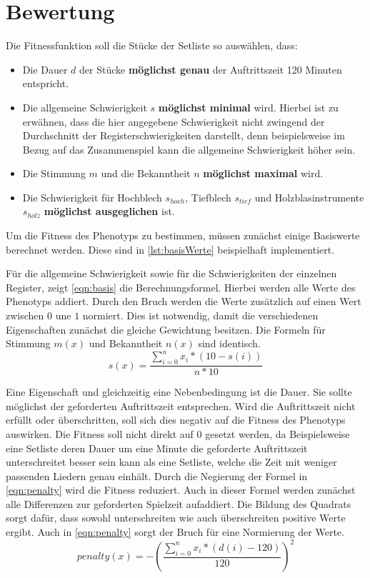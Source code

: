 \section{Bewertung}\label{sec:fitness}
Die Fitnessfunktion soll die Stücke der Setliste so auswählen, dass:
\begin{itemize}
    \item Die Dauer $d$ der Stücke \textbf{möglichst genau} der Auftrittszeit 120 Minuten entspricht.
    \item Die allgemeine Schwierigkeit $s$ \textbf{möglichst minimal} wird. Hierbei ist zu erwähnen, dass die hier
        angegebene Schwierigkeit nicht zwingend der Durchschnitt der Registerschwierigkeiten darstellt, denn
        beispielsweise im Bezug auf das Zusammenspiel kann die allgemeine Schwierigkeit höher sein.
    \item Die Stimmung $m$ und die Bekanntheit $n$ \textbf{möglichst maximal} wird.
    \item Die Schwierigkeit für Hochblech $s_{hoch}$, Tiefblech $s_{tief}$ und Holzblasinstrumente $s_{holz}$ \textbf{möglichst ausgeglichen} ist.
\end{itemize}
Um die Fitness des Phenotyps zu bestimmen, müssen zunächst einige Basiswerte berechnet werden. Diese sind in \autoref{lst:basisWerte} beispielhaft implementiert.

Für die allgemeine Schwierigkeit sowie für die Schwierigkeiten der einzelnen Register, zeigt \autoref{eqn:basis} die Berechnungsformel. Hierbei werden alle Werte des
Phenotyps addiert. Durch den Bruch werden die Werte zusätzlich auf einen Wert zwischen $0$ une $1$ normiert. Dies ist notwendig, 
damit die verschiedenen Eigenschaften zunächst die gleiche Gewichtung besitzen. 
Die Formeln für Stimmung $m(x)$ und Bekanntheit $n(x)$ sind identisch.
\begin{equation}
    s(x) = \frac{\sum_{i=0}^{n} x_i * (10 - s(i)) }{n * 10}
    \label{eqn:basis}
\end{equation}

Eine Eigenschaft und gleichzeitig eine Nebenbedingung ist die Dauer. Sie sollte möglichst der geforderten Auftrittszeit entsprechen. Wird die Auftrittszeit nicht erfüllt
oder überschritten, soll sich dies negativ auf die Fitness des Phenotyps auswirken. Die Fitness soll nicht direkt auf 0 gesetzt werden, da
Beispielsweise eine Setliste deren Dauer um eine Minute die geforderte Auftrittszeit unterschreitet besser sein kann als eine Setliste, welche die Zeit mit weniger passenden Liedern 
genau einhält.
Durch die Negierung der Formel in \autoref{eqn:penalty} wird die Fitness reduziert. Auch in dieser Formel werden zunächst alle Differenzen zur geforderten
Spielzeit aufaddiert. Die Bildung des Quadrats sorgt dafür, dass sowohl unterschreiten wie auch überschreiten
positive Werte ergibt.
Auch in \autoref{eqn:penalty} sorgt der Bruch für eine Normierung der Werte.
\begin{equation}
    penalty(x) = -\left( \frac{\sum_{i=0}^{n}x_i * (d(i)-120)}{120}\right)^2
    \label{eqn:penalty}
\end{equation}

